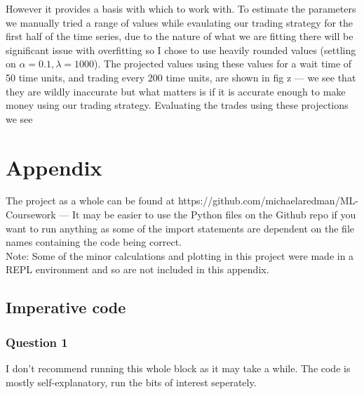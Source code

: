 \documentclass[a4paper]{article}
\begin{document}
However it provides a basis with which to work with. To estimate the parameters we manually tried a range of values while evaulating our trading strategy for the first half of the time series, due to the nature of what we are fitting there will be significant issue with overfitting so I chose to use heavily rounded values (settling on $\alpha = 0.1, \lambda = 1000$). The projected values using these values for a wait time of 50 time units, and trading every 200 time units, are shown in fig z --- we see that they are wildly inaccurate but what matters is if it is accurate enough to make money using our trading strategy. Evaluating the trades using these projections we see 

\newpage

\section*{Appendix}

The project as a whole can be found at https://github.com/michaelaredman/ML-Coursework --- It may be easier to use the Python files on the Github repo if you want to run anything as some of the import statements are dependent on the file names containing the code being correct. \\
 
Note: Some of the minor calculations and plotting in this project were made in a REPL environment and so are not included in this appendix.

\subsection*{Imperative code}

\subsubsection*{Question 1}

I don't recommend running this whole block as it may take a while. The code is mostly self-explanatory, run the bits of interest seperately.
\end{document}
